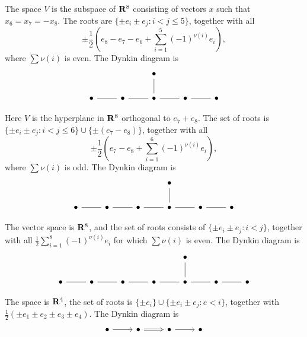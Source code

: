 \begin{example}
The space $V$ is the subspace of $\mathbf{R}^8$ consisting of vectors $x$ such that 
$x_6=x_7=-x_8$. The roots are $\{\pm e_i\pm e_j:i<j\leqslant 5\}$, together 
with all 
\[
  \pm \frac 1 2\left(e_8-e_7-e_6 + \sum_{i=1}^5 (-1)^{\nu(i)} e_i\right) ,
\]
where $\sum \nu(i)$ is even. The Dynkin diagram is 
\[\begin{tikzcd}
  & & \bullet \\
  \bullet \ar[r, dash] 
    & \bullet \ar[r, dash]
    & \bullet \ar[r, dash] \ar[u, dash]
    & \bullet \ar[r, dash] 
    & \bullet 
\end{tikzcd}\]
\end{example}

\begin{example}
Here $V$ is the hyperplane in $\mathbf{R}^8$ orthogonal to $e_7+e_8$. The set of 
roots is $\{\pm e_i\pm e_j:i<j\leqslant 6\}\cup\{\pm (e_7-e_8)\}$, together 
with all 
\[
  \pm \frac 1 2\left(e_7-e_8+\sum_{i=1}^6 (-1)^{\nu(i)} e_i\right) ,
\]
where $\sum \nu(i)$ is odd. The Dynkin diagram is 
\[\begin{tikzcd}
  & & & \bullet \\
  \bullet \ar[r, dash] 
    & \bullet \ar[r, dash]
    & \bullet \ar[r, dash]
    & \bullet \ar[r, dash] \ar[u, dash]
    & \bullet \ar[r, dash] 
    & \bullet 
\end{tikzcd}\]
\end{example}

\begin{example}
The vector space is $\mathbf{R}^8$, and the set of roots consists of 
$\{\pm e_i\pm e_j:i<j\}$, together with all 
$\frac 1 2 \sum_{i=1}^8 (-1)^{\nu(i)} e_i$ for which $\sum \nu(i)$ is even. The 
Dynkin diagram is 
\[\begin{tikzcd}
  & & & & \bullet \\
  \bullet \ar[r, dash] 
    & \bullet \ar[r, dash]
    & \bullet \ar[r, dash]
    & \bullet \ar[r, dash]
    & \bullet \ar[r, dash] \ar[u, dash]
    & \bullet \ar[r, dash] 
    & \bullet 
\end{tikzcd}\]
\end{example}

\begin{example}
The space is $\mathbf{R}^4$, the set of roots is 
$\{\pm e_i\}\cup \{\pm e_i\pm e_j:e<i\}$, together with 
$\frac 1 2(\pm e_1\pm e_2\pm e_3\pm e_4)$. The Dynkin diagram is 
\[\begin{tikzcd}
  \bullet \ar[r] 
    & \bullet \ar[r, Rightarrow] 
    & \bullet \ar[r] 
    & \bullet
\end{tikzcd}\]
\end{example}

